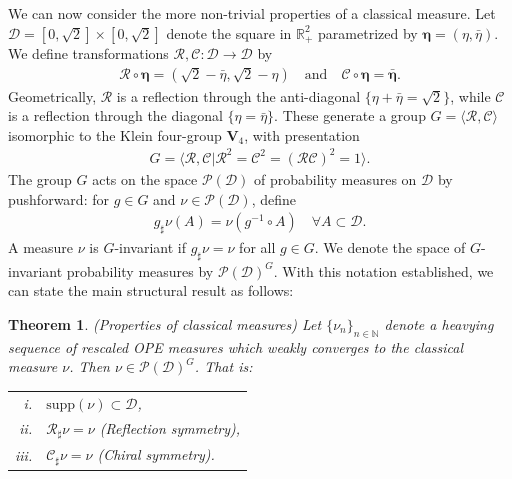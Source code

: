 \documentclass[a4paper,11pt]{article}
\theoremstyle{plain}
\newtheorem{thm}{Theorem}[section]
\theoremstyle{definition}
\theoremstyle{remark}
\newcommand{\bs}[1]{\boldsymbol{#1}}
\newcommand{\ba}{\begin{equation} \begin{aligned}}
\newcommand{\ea}{\end{aligned} \end{equation}}
\begin{document}
We can now consider the more non-trivial properties of a classical measure. Let $\mathcal{D} = [0,\sqrt{2}] \times [0,\sqrt{2}]$ denote the square in $\mathbb{R}_+^2$ parametrized by $\bs{\eta} = (\eta,\bar{\eta})$. We define transformations $\mathcal{R},\mathcal{C}:\mathcal{D} \to \mathcal{D}$ by
\ba
\mathcal{R}\circ\bs{\eta} = (\sqrt{2} -\bar{\eta}, \sqrt{2} - \eta) \quad\text{and}\quad \mathcal{C}\circ\bs{\eta} = \bar{\bs{\eta}}.
\ea
Geometrically, $\mathcal{R}$ is a reflection through the anti-diagonal $\{\eta + \bar{\eta} = \sqrt{2}\}$, while $\mathcal{C}$ is a reflection through the diagonal $\{\eta = \bar{\eta} \}$. These generate a group $G =\langle \mathcal{R},\mathcal{C}\rangle$ isomorphic to the Klein four-group $\mathbf{V}_4$, with presentation
\ba
G = \langle \mathcal{R},\mathcal{C}| \mathcal{R}^2 = \mathcal{C}^2 = (\mathcal{R}\mathcal{C})^2 = 1 \rangle.
\ea
The group $G$ acts on the space $\mathcal{P}(\mathcal{D})$ of probability measures on $\mathcal{D}$ by pushforward: for $g \in G$ and $\nu \in \mathcal{P}(\mathcal{D})$, define 
\ba
g_\sharp\nu(A) = \nu( g^{-1} \circ A) \quad \forall A \subset \mathcal{D}.
\ea
A measure $\nu$ is $G$-invariant if $g_\sharp\nu = \nu$ for all $g \in G$. We denote the space of $G$-invariant probability measures by $\mathcal{P}(\mathcal{D})^G$. With this notation established, we can state the main structural result as follows:
\begin{thm} (Properties of classical measures)
\label{thm:maxheavy}
Let $\{\nu_n\}_{n \in \mathbb{N}}$ denote a heavying sequence of rescaled OPE measures which weakly converges to the classical measure $\nu$. Then $\nu \in \mathcal{P}(\mathcal{D})^G$. That is:
\begin{center}
\begin{tabular}{rl}
    i. & $\mathrm{supp}(\nu) \subset \mathcal{D}$, \\[0.5em]
    ii. & $\mathcal{R}_\sharp \nu = \nu$ \quad (Reflection symmetry), \\[0.5em]
    iii. & $\mathcal{C}_\sharp \nu = \nu$ \quad (Chiral symmetry).
\end{tabular}
\end{center}
\end{thm}
\end{document}
